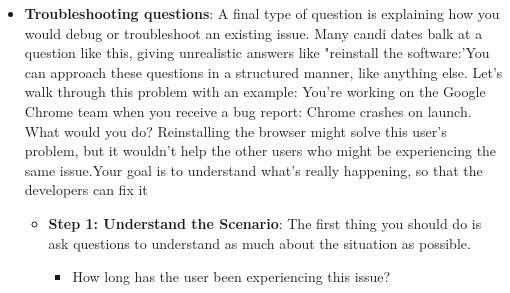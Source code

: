 \documentclass{report}
\begin{document}
\begin{itemize}
\begin{itemize}
                    \bigbreak \noindent 
                    Remember that it's not up to you to just magically decide the use cases. This is a conversation to have with your interviewer.
                \item \textbf{What are the bounds of use?}: Now that we have the vague use cases defined, we need to figure out what exactly this means. What does it mean for a website to be blocked? Should just the "illegal" page be blocked, or the entire website? Is the application supposed to"learn" what is bad content, or is it based on a white list or black list? If it's supposed to learn what inappropriate content is, what degree of false positives or false negatives is acceptable?
                \item \textbf{What are the stress conditions/ failure conditions?}: When the software fails-which it inevitably will-what should the failure look like? Clearly, the software failure shouldn't crash the computer. Instead, it's likely that the software should just permit a blocked site, or ban an allowable site. In the latter case, you might want to discuss the possibility of a selective override with a password from the parents.
            \end{itemize}
        \item \textbf{Troubleshooting questions}: 
            A final type of question is explaining how you would debug or troubleshoot an existing issue. Many candi dates balk at a question like this, giving unrealistic answers like "reinstall the software:'You can approach these questions in a structured manner, like anything else.
            \bigbreak \noindent 
            Let's walk through this problem with an example: You're working on the Google Chrome team when you receive a bug report: Chrome crashes on launch. What would you do?
            \bigbreak \noindent 
            Reinstalling the browser might solve this user's problem, but it wouldn't help the other users who might be experiencing the same issue.Your goal is to understand what's really happening, so that the developers can fix it
            \begin{itemize}
                \item \textbf{Step 1: Understand the Scenario}: The first thing you should do is ask questions to understand as much about the situation as possible.
                    \begin{itemize}
                        \item How long has the user been experiencing this issue?

\end{itemize}
\end{itemize}
\end{itemize}
\end{document}
